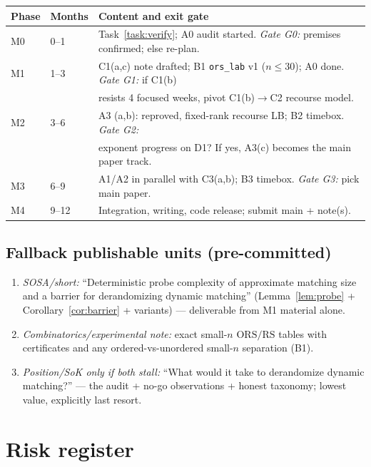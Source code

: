 \documentclass[11pt]{article}
\theoremstyle{definition}
\theoremstyle{remark}
\newcommand{\ORS}{\mathrm{ORS}}
\newcommand{\RS}{\mathrm{RS}}
\begin{document}
\begin{center}
\small
\begin{tabular}{@{}lll@{}}
\toprule
Phase & Months & Content and exit gate\\
\midrule
M0 & 0--1 & Task~\ref{task:verify}; A0 audit started.
\emph{Gate G0:} premises confirmed; else re-plan.\\
M1 & 1--3 & C1(a,c) note drafted; B1 \texttt{ors\_lab} v1 ($n\le30$);
A0 done. \emph{Gate G1:} if C1(b)\\
 & & resists 4 focused weeks, pivot C1(b)$\to$C2 recourse model.\\
M2 & 3--6 & A3 (a,b): \cite{BBKS25} reproved, fixed-rank recourse LB;
B2 timebox. \emph{Gate G2:}\\
 & & exponent progress on D1? If yes, A3(c) becomes the main paper
track.\\
M3 & 6--9 & A1/A2 in parallel with C3(a,b); B3 timebox.
\emph{Gate G3:} pick main paper.\\
M4 & 9--12 & Integration, writing, code release; submit main +
note(s).\\
\bottomrule
\end{tabular}
\end{center}

\subsection{Fallback publishable units (pre-committed)}
\begin{enumerate}[itemsep=2pt]
\item \emph{SOSA/short:} ``Deterministic probe complexity of approximate
matching size and a barrier for derandomizing dynamic matching''
(Lemma~\ref{lem:probe} + Corollary~\ref{cor:barrier} + variants) ---
deliverable from M1 material alone.
\item \emph{Combinatorics/experimental note:} exact small-$n$
$\ORS/\RS$ tables with certificates and any ordered-vs-unordered
small-$n$ separation (B1).
\item \emph{Position/SoK only if both stall:} ``What would it take to
derandomize dynamic matching?'' --- the audit + no-go observations +
honest taxonomy; lowest value, explicitly last resort.
\end{enumerate}

\section{Risk register}
\label{sec:risks}
\end{document}
